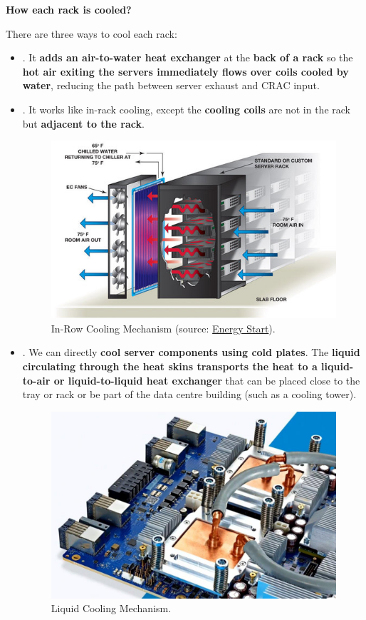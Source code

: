 \begin{flushleft}
	\textcolor{Green3}{ \textbf{How each rack is cooled?}}
\end{flushleft}
There are three ways to cool each rack:
\begin{itemize}
	\item {}. It \textbf{adds an air-to-water heat exchanger} at the \textbf{back of a rack} so the \textbf{hot air exiting the servers immediately flows over coils cooled by water}, reducing the path between server exhaust and CRAC input.
	
	\item {}. It works like in-rack cooling, except the \textbf{cooling coils} are not in the rack but \textbf{adjacent to the rack}.
	\begin{figure}[!htp]
		\centering
		\includegraphics[width=\textwidth]{img/in-row-cooling-1.png}
		\caption{In-Row Cooling Mechanism (source: \href{https://www.energystar.gov/products/data_center_equipment/16-more-ways-cut-energy-waste-data-center/install-rack-or-row}{Energy Start}).}
	\end{figure}
	
	
	\item {}. We can directly \textbf{cool server components using cold plates}. The \textbf{liquid circulating through the heat skins transports the heat to a liquid-to-air or liquid-to-liquid heat exchanger} that can be placed close to the tray or rack or be part of the data centre building (such as a cooling tower).
	\begin{figure}[!htp]
		\centering
		\includegraphics[width=.45\textwidth]{img/liquid-cooling-1.jpg}
		\caption{Liquid Cooling Mechanism.}
	\end{figure}
\end{itemize}

